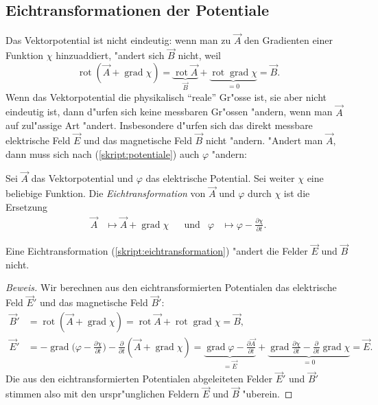 \subsection{Eichtransformationen der Potentiale}
Das Vektorpotential ist nicht eindeutig: wenn man zu $\vec A$
den Gradienten einer Funktion $\chi$ hinzuaddiert, "andert sich
$\vec B$ nicht, weil
\[
\operatorname{rot}(\vec A+\operatorname{grad}\chi)
=
\underbrace{\operatorname{rot}\vec A}_{\vec B}
+
\underbrace{\operatorname{rot}\operatorname{grad}\chi}_{=0}
=
\vec B.
\]
Wenn das Vektorpotential die physikalisch ``reale'' Gr"osse ist,
sie aber nicht eindeutig ist, dann d"urfen sich keine messbaren
Gr"ossen "andern, wenn man $\vec A$ auf zul"assige Art "andert.
Insbesondere d"urfen sich das direkt messbare elektrische Feld
$\vec E$ und das magnetische Feld $\vec B$ nicht "andern.
"Andert man $\vec A$, dann muss sich nach (\ref{skript:potentiale})
auch $\varphi$ "andern:

\begin{definition}
Sei $\vec A$ das Vektorpotential und $\varphi$ das elektrische
Potential. Sei weiter $\chi$ eine beliebige Funktion.
Die {\em Eichtransformation} von $\vec A$ und $\varphi$ durch $\chi$ ist
die Ersetzung
\begin{equation}
\begin{aligned}
\vec A&\mapsto \vec A + \operatorname{grad}\chi
&&\text{und}&
\varphi&\mapsto \varphi-\frac{\partial\chi}{\partial t}.
\end{aligned}
\label{skript:eichtransformation}
\end{equation}
\end{definition}

\begin{satz}
Eine Eichtransformation (\ref{skript:eichtransformation}) "andert die
Felder $\vec E$ und $\vec B$ nicht.
\end{satz}

\begin{proof}[Beweis]
Wir berechnen aus den eichtransformierten Potentialen das elektrische Feld
$\vec E'$ und das magnetische Feld $\vec B'$:
\begin{align*}
\vec B'
&=
\operatorname{rot}(\vec A+\operatorname{grad}\chi)
=
\operatorname{rot}\vec A+\operatorname{rot}\operatorname{grad}\chi
=
\vec B,
\\
\vec E'
&=
-\operatorname{grad}\biggl(\varphi -\frac{\partial\chi}{\partial t}\biggr)
-\frac{\partial}{\partial t}(\vec A+\operatorname{grad}\chi)
=
\underbrace{
\operatorname{grad}\varphi-\frac{\partial\vec A}{\partial t}
}_{=\vec E}
+
\underbrace{
\operatorname{grad}\frac{\partial\chi}{\partial t}
-\frac{\partial}{\partial t}\operatorname{grad}\chi
}_{=0}
=
\vec E.
\end{align*}
Die aus den eichtransformierten Potentialen abgeleiteten Felder $\vec E'$
und $\vec B'$ stimmen also mit den urspr"unglichen Feldern $\vec E$
und $\vec B$ "uberein.
\end{proof}

